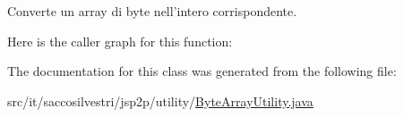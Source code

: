 \-Converte un array di byte nell'intero corrispondente. 



\-Here is the caller graph for this function\-:




\-The documentation for this class was generated from the following file\-:\begin{DoxyCompactItemize}
\item 
src/it/saccosilvestri/jsp2p/utility/\hyperlink{_byte_array_utility_8java}{\-Byte\-Array\-Utility.\-java}\end{DoxyCompactItemize}
